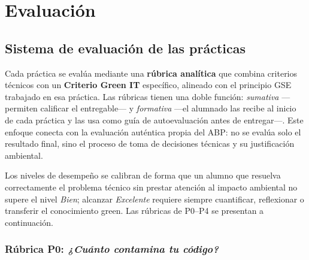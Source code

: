 \chapter{Evaluación}
\label{cap:capitulo5}

\section{Sistema de evaluación de las prácticas}

Cada práctica se evalúa mediante una \textbf{rúbrica analítica} que combina criterios técnicos con un \textbf{Criterio Green IT} específico, alineado con el principio GSE trabajado en esa práctica. Las rúbricas tienen una doble función: \textit{sumativa} —permiten calificar el entregable— y \textit{formativa} —el alumnado las recibe al inicio de cada práctica y las usa como guía de autoevaluación antes de entregar—. Este enfoque conecta con la evaluación auténtica propia del ABP: no se evalúa solo el resultado final, sino el proceso de toma de decisiones técnicas y su justificación ambiental.

Los niveles de desempeño se calibran de forma que un alumno que resuelva correctamente el problema técnico sin prestar atención al impacto ambiental no supere el nivel \textit{Bien}; alcanzar \textit{Excelente} requiere siempre cuantificar, reflexionar o transferir el conocimiento green. Las rúbricas de P0–P4 se presentan a continuación.

\newpage
\FloatBarrier
\subsection{Rúbrica P0: \textit{¿Cuánto contamina tu código?}}

